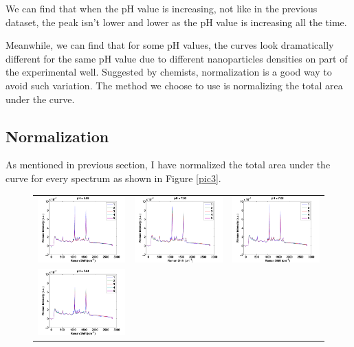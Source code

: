 \documentclass[a4paper]{article}
\begin{document}
We can find that when the pH value is increasing, not like in the previous dataset, the peak isn't lower and lower as the pH value is increasing all the time.

Meanwhile, we can find that for some pH values, the curves look dramatically different for the same pH value due to different nanoparticles densities on part of the experimental well. Suggested by chemists, normalization is a good way to avoid such variation. The method we choose to use is normalizing the total area under the curve.
\subsection{Normalization}
As mentioned in previous section, I have normalized the total area under the curve for every spectrum as shown in Figure \ref{pic3}.
\begin{figure}[h]
\centering
\begin{tabular}{ccc}
\includegraphics[width=.33\textwidth]{images/n1.pdf}  & 
\includegraphics[width=.33\textwidth]{images/n2.pdf}  &
\includegraphics[width=.33\textwidth]{images/n3.pdf}  \\ 
\includegraphics[width=.33\textwidth]{images/n4.pdf}  &

\end{tabular}
\end{figure}
\end{document}
